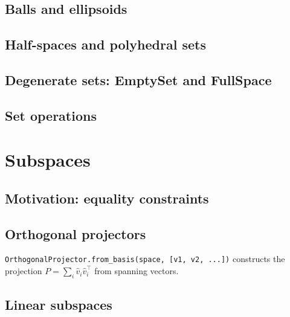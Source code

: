 \documentclass[11pt,twoside,openright]{book}
\theoremstyle{plain}
\theoremstyle{definition}
\theoremstyle{remark}
\begin{document}
\section{Balls and ellipsoids}
\label{sec:balls-ellipsoids}

\section{Half-spaces and polyhedral sets}
\label{sec:halfspaces-polyhedra}

\section{Degenerate sets: EmptySet and FullSpace}
\label{sec:degenerate-sets}

\section{Set operations}
\label{sec:set-operations}


\chapter{Subspaces}
\label{ch:subspaces}

\section{Motivation: equality constraints}
\label{sec:subspace-motivation}

\section{Orthogonal projectors}
\label{sec:projectors}

\begin{codebox}
\texttt{OrthogonalProjector.from\_basis(space, [v1, v2, ...])} constructs
the projection $P = \sum_i \hat{v}_i \hat{v}_i^\top$ from spanning vectors.
\end{codebox}

\section{Linear subspaces}
\label{sec:linear-subspaces}
\end{document}

